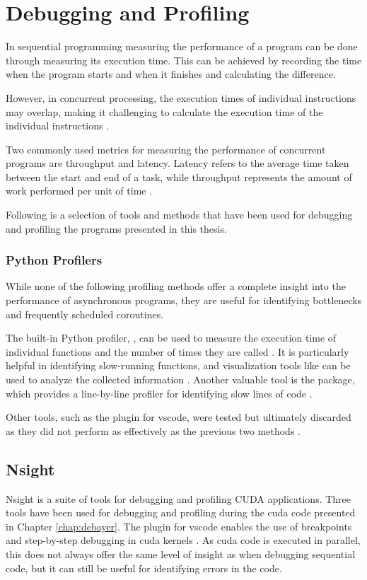 
\section{Debugging and Profiling}
In sequential programming measuring the performance of a program can be done through measuring its execution time.
This can be achieved by recording the time when the program starts and when it finishes and calculating the difference.

However, in concurrent processing, the execution times of individual instructions may overlap, making it challenging to calculate the execution time of the individual instructions \cite[21]{volkovLatencyHiding2016}.

Two commonly used metrics for measuring the performance of concurrent programs are throughput and latency.
Latency refers to the average time taken between the start and end of a task, while throughput represents the amount of work performed per unit of time \cite[21-23]{volkovLatencyHiding2016}.

Following is a selection of tools and methods that have been used for debugging and profiling the programs presented in this thesis.

\subsubsection{Python Profilers}
While none of the following profiling methods offer a complete insight into the performance of asynchronous \py programs, they are useful for identifying bottlenecks and frequently scheduled coroutines.

The built-in Python profiler, , can be used to measure the execution time of individual functions and the number of times they are called \cite{pythonsoftwarefoundationPythonProfilers}.
It is particularly helpful in identifying slow-running functions, and visualization tools like  can be used to analyze the collected information \cite{davisSnakeViz2023}.
Another valuable tool is the  package, which provides a line-by-line profiler for identifying slow lines of code \cite{kernLineProfilerKernprof2023}.

Other tools, such as the  plugin for \gls{vscode}, were tested but ultimately discarded as they did not perform as effectively as the previous two methods \cite{tornettaAustinVSCode2023}.

\subsection{Nsight}
Nsight is a suite of tools for debugging and profiling CUDA applications.
Three tools have been used for debugging and profiling during the \gls{cuda} code presented in Chapter \ref{chap:debayer}.
The  plugin for \gls{vscode} enables the use of breakpoints and step-by-step debugging in \gls{cuda} kernels \cite{nvidiaNsightVisualStudio2021}.
As \gls{cuda} code is executed in parallel, this does not always offer the same level of insight as when debugging sequential code, but it can still be useful for identifying errors in the code.

